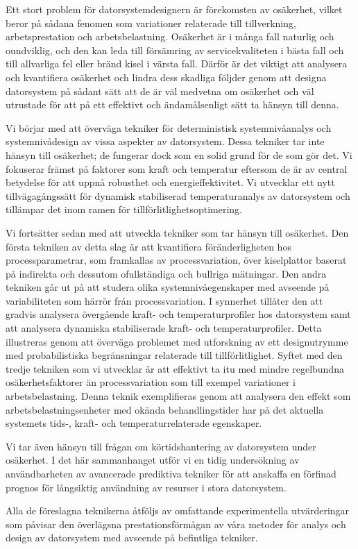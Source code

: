 Ett stort problem för datorsystemdesignern är förekomsten av osäkerhet, vilket
beror på sådana fenomen som variationer relaterade till tillverkning,
arbetsprestation och arbetsbelastning. Osäkerhet är i många fall naturlig och
oundviklig, och den kan leda till försämring av servicekvaliteten i bästa fall
och till allvarliga fel eller bränd kisel i värsta fall. Därför är det viktigt
att analysera och kvantifiera osäkerhet och lindra dess skadliga följder genom
att designa datorsystem på sådant sätt att de är väl medvetna om osäkerhet och
väl utrustade för att på ett effektivt och ändamålsenligt sätt ta hänsyn till
denna.

Vi börjar med att överväga tekniker för deterministisk systemnivåanalys och
systemnivådesign av vissa aspekter av datorsystem. Dessa tekniker tar inte
hänsyn till osäkerhet; de fungerar dock som en solid grund för de som gör det.
Vi fokuserar främst på faktorer som kraft och temperatur eftersom de är av
central betydelse för att uppnå robusthet och energieffektivitet. Vi utvecklar
ett nytt tillvägagångssätt för dynamisk stabiliserad temperaturanalys av
datorsystem och tillämpar det inom ramen för tillförlitlighetsoptimering.

Vi fortsätter sedan med att utveckla tekniker som tar hänsyn till osäkerhet. Den
första tekniken av detta slag är att kvantifiera föränderligheten hos
processparametrar, som framkallas av processvariation, över kiselplattor baserat
på indirekta och dessutom ofullständiga och bullriga mätningar. Den andra
tekniken går ut på att studera olika systemnivåegenskaper med avseende på
variabiliteten som härrör från processvariation. I synnerhet tillåter den att
gradvis analysera övergående kraft- och temperaturprofiler hos datorsystem samt
att analysera dynamiska stabiliserade kraft- och temperaturprofiler. Detta
illustreras genom att överväga problemet med utforskning av ett designutrymme
med probabilistiska begränsningar relaterade till tillförlitlighet. Syftet med
den tredje tekniken som vi utvecklar är att effektivt ta itu med mindre
regelbundna osäkerhetsfaktorer än processvariation som till exempel variationer
i arbetsbelastning. Denna teknik exemplifieras genom att analysera den effekt
som arbetsbelastningsenheter med okända behandlingstider har på det aktuella
systemets tids-, kraft- och temperaturrelaterade egenskaper.

Vi tar även hänsyn till frågan om körtidshantering av datorsystem under
osäkerhet. I det här sammanhanget utför vi en tidig undersökning av
användbarheten av avancerade prediktiva tekniker för att anskaffa en förfinad
prognos för långsiktig användning av resurser i stora datorsystem.

Alla de föreslagna teknikerna åtföljs av omfattande experimentella utvärderingar
som påvisar den överlägsna prestationsförmågan av våra metoder för analys och
design av datorsystem med avseende på befintliga tekniker.

